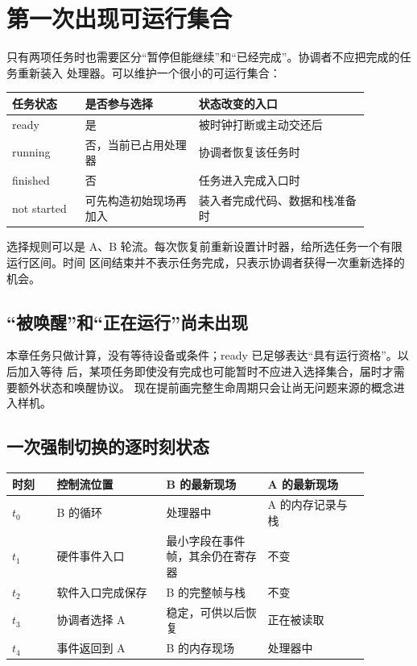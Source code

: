 \section{第一次出现可运行集合}

只有两项任务时也需要区分“暂停但能继续”和“已经完成”。协调者不应把完成的任务重新装入
处理器。可以维护一个很小的可运行集合：

\begin{longtable}{|L{0.18\linewidth}|L{0.28\linewidth}|L{0.42\linewidth}|}
\hline
{}
任务状态 & 是否参与选择 & 状态改变的入口 \\ \hline
ready & 是 & 被时钟打断或主动交还后 \\ \hline
running & 否，当前已占用处理器 & 协调者恢复该任务时 \\ \hline
finished & 否 & 任务进入完成入口时 \\ \hline
not started & 可先构造初始现场再加入 & 装入者完成代码、数据和栈准备时 \\ \hline
\end{longtable}

选择规则可以是 A、B 轮流。每次恢复前重新设置计时器，给所选任务一个有限运行区间。时间
区间结束并不表示任务完成，只表示协调者获得一次重新选择的机会。

\subsection{“被唤醒”和“正在运行”尚未出现}

本章任务只做计算，没有等待设备或条件；ready 已足够表达“具有运行资格”。以后加入等待
后，某项任务即使没有完成也可能暂时不应进入选择集合，届时才需要额外状态和唤醒协议。
现在提前画完整生命周期只会让尚无问题来源的概念进入样机。

\subsection{一次强制切换的逐时刻状态}

\begin{longtable}{|L{0.11\linewidth}|L{0.27\linewidth}|L{0.25\linewidth}|L{0.25\linewidth}|}
\hline
{}
时刻 & 控制流位置 & B 的最新现场 & A 的最新现场 \\ \hline
\(t_0\) & B 的循环 & 处理器中 & A 的内存记录与栈 \\ \hline
\(t_1\) & 硬件事件入口 & 最小字段在事件帧，其余仍在寄存器 & 不变 \\ \hline
\(t_2\) & 软件入口完成保存 & B 的完整帧与栈 & 不变 \\ \hline
\(t_3\) & 协调者选择 A & 稳定，可供以后恢复 & 正在被读取 \\ \hline
\(t_4\) & 事件返回到 A & B 的内存现场 & 处理器中 \\ \hline
\end{longtable}

